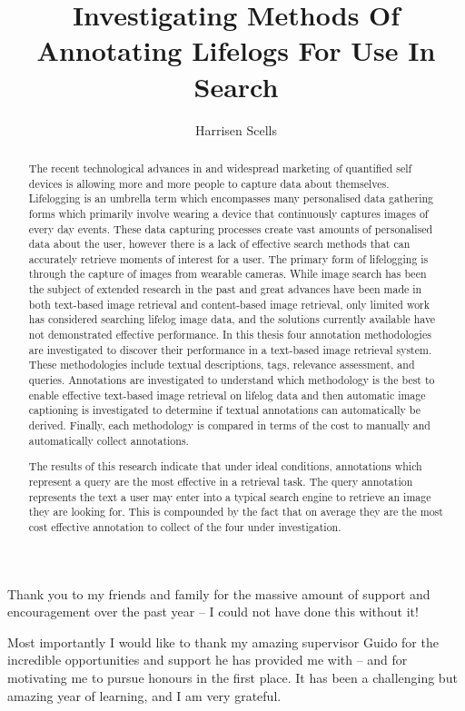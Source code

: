 \documentclass[12pt,a4paper]{book}
\begin{document}
\title{Investigating Methods Of Annotating Lifelogs For Use In Search}

\author{Harrisen Scells}
\insidetitlepage
\setcounter{page}{1}
\begin{dedication}
Thank you to my friends and family for the massive amount of support and encouragement over the past year -- I could not have done this without it!

Most importantly I would like to thank my amazing supervisor Guido for the incredible opportunities and support he has provided me with -- and for motivating me to pursue honours in the first place. It has been a challenging but amazing year of learning, and I am very grateful.
\end{dedication}

\begin{abstract}
The recent technological advances in and widespread marketing of quantified self devices is allowing more and more people to capture data about themselves. Lifelogging is an umbrella term which encompasses many personalised data gathering forms which primarily involve wearing a device that continuously captures images of every day events. These data capturing processes create vast amounts of personalised data about the user, however there is a lack of effective search methods that can accurately retrieve moments of interest for a user. The primary form of lifelogging is through the capture of images from wearable cameras. While image search has been the subject of extended research in the past and great advances have been made in both text-based image retrieval and content-based image retrieval, only limited work has considered searching lifelog image data, and the solutions currently available have not demonstrated effective performance. In this thesis four annotation methodologies are investigated to discover their performance in a text-based image retrieval system. These methodologies include textual descriptions, tags, relevance assessment, and queries. Annotations are investigated to understand which methodology is the best to enable effective text-based image retrieval on lifelog data and then automatic image captioning is investigated to determine if textual annotations can automatically be derived. Finally, each methodology is compared in terms of the cost to manually and automatically collect annotations.

The results of this research indicate that under ideal conditions, annotations which represent a query are the most effective in a retrieval task. The query annotation represents the text a user may enter into a typical search engine to retrieve an image they are looking for. This is compounded by the fact that on average they are the most cost effective annotation to collect of the four under investigation.
\end{abstract}
\end{document}
